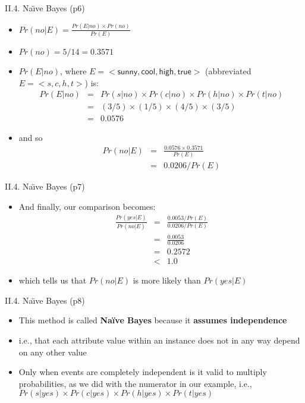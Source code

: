 \documentclass[handout]{beamer}
\newcommand{\strong}[1]{\textbf{\color{teal} #1}}
\newcommand{\stronger}[1]{\textbf{\color{purple} #1}}
\begin{document}
\begin{frame}{II.4. Na\"{\i}ve Bayes (p6)}
\begin{itemize}
\item $Pr(no|E) = \frac{Pr(E|no) \times Pr(no)}{Pr(E)}$
\item $Pr(no) = 5 / 14 = 0.3571$\\
\item $Pr(E|no)$, where $E=< \mathsf{sunny, cool, high, true} >$ (abbreviated $E=<s,c,h,t>$) is:
\begin{eqnarray*}
Pr(E|no) & = & Pr(s|no) \times Pr(c|no) \times Pr(h|no) \times Pr(t|no) \\
         & = & (3/5) \times (1/5) \times (4/5) \times (3/5) \\
         & = & 0.0576
\end{eqnarray*}
\item and so
\begin{eqnarray*}
Pr(no|E) & = & \frac{ 0.0576 \times 0.3571 }{Pr(E)} \\
         & = & 0.0206 / Pr(E)
\end{eqnarray*}
\end{itemize}
\end{frame}
\begin{frame}{II.4. Na\"{\i}ve Bayes (p7)}
\begin{itemize}
\item And finally, our comparison becomes:
\begin{eqnarray*}
\frac{Pr(yes|E)}{Pr(no|E)} & = & \frac{ 0.0053 / Pr(E) }{ 0.0206 / Pr(E) } \\
                           & = & \frac{ 0.0053 }{ 0.0206 } \\
                           & = & 0.2572 \\
                           & < & 1.0
\end{eqnarray*}
\item which tells us that $Pr(no|E)$ is more likely than $Pr(yes|E)$
\end{itemize}
\end{frame}
\begin{frame}{II.4. Na\"{\i}ve Bayes (p8)}
\begin{itemize}
\item This method is called \stronger{Na\"{i}ve Bayes} because it \strong{assumes independence}
\item[] i.e., that each attribute value within an instance does not in any way depend on any other value
\item Only when events are completely independent is it valid to multiply probabilities, as we did with the numerator in our example, i.e.,\\
$Pr(s|yes) \times Pr(c|yes) \times Pr(h|yes) \times Pr(t|yes)$
\end{itemize}
\end{frame}
\end{document}
